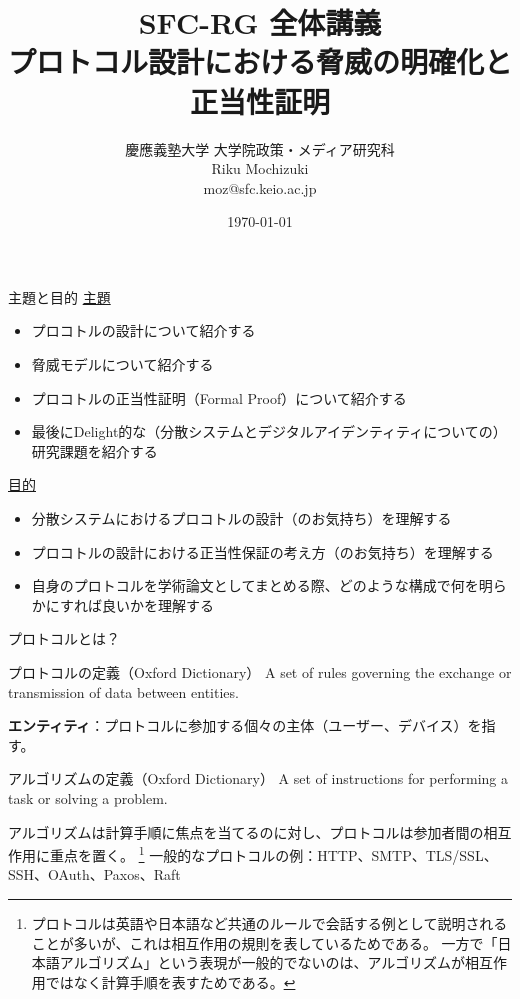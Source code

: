 \documentclass[aspectratio=169,10pt]{beamer}
\title{\textsc{SFC-RG 全体講義} \\ プロトコル設計における脅威の明確化と正当性証明}
\author{
    慶應義塾大学 大学院政策・メディア研究科\\
    \vspace{0.5em}
    Riku Mochizuki\\
    moz@sfc.keio.ac.jp
}
\date{\today}
\newenvironment{proofblock}[1][]
{\begin{block}{#1}\vspace{0.5em}}
{\vspace{0.5em}\end{block}}
\begin{document}
\begin{frame}
\titlepage
\end{frame}


\begin{frame}{主題と目的}
\underline{主題}
\begin{itemize}
    \item プロコトルの設計について紹介する
    \item 脅威モデルについて紹介する
    \item プロコトルの正当性証明（Formal Proof）について紹介する
    \item 最後にDelight的な（分散システムとデジタルアイデンティティについての）研究課題を紹介する
\end{itemize}

\underline{目的}
\begin{itemize}
    \item 分散システムにおけるプロコトルの設計（のお気持ち）を理解する
    \item プロコトルの設計における正当性保証の考え方（のお気持ち）を理解する
    \item 自身のプロトコルを学術論文としてまとめる際、どのような構成で何を明らかにすれば良いかを理解する
\end{itemize}
\end{frame}

\begin{frame}{プロトコルとは？}
\begin{proofblock}[プロトコルの定義（Oxford Dictionary）]
A set of rules governing the exchange or transmission of data between entities.
\end{proofblock}

\textbf{エンティティ}：プロトコルに参加する個々の主体（ユーザー、デバイス）を指す。



\begin{proofblock}[アルゴリズムの定義（Oxford Dictionary）]
A set of instructions for performing a task or solving a problem.
\end{proofblock}

アルゴリズムは計算手順に焦点を当てるのに対し、プロトコルは参加者間の相互作用に重点を置く。
\footnote{プロトコルは英語や日本語など共通のルールで会話する例として説明されることが多いが、これは相互作用の規則を表しているためである。
一方で「日本語アルゴリズム」という表現が一般的でないのは、アルゴリズムが相互作用ではなく計算手順を表すためである。}
一般的なプロトコルの例：HTTP、SMTP、TLS/SSL、SSH、OAuth、Paxos、Raft

\end{frame}
\end{document}
